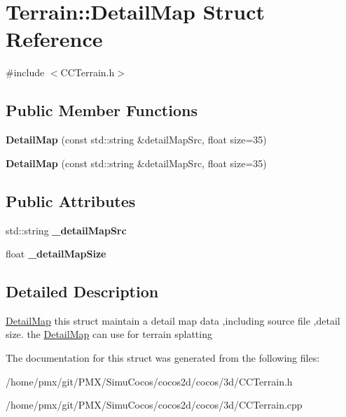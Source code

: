 \hypertarget{structTerrain_1_1DetailMap}{}\section{Terrain\+:\+:Detail\+Map Struct Reference}
\label{structTerrain_1_1DetailMap}


{\ttfamily \#include $<$C\+C\+Terrain.\+h$>$}

\subsection*{Public Member Functions}
\begin{DoxyCompactItemize}
\item 
\mbox{\label{structTerrain_1_1DetailMap_ae0789bb6945e15fe47b8c59c6853d017}} 
{\bfseries Detail\+Map} (const std\+::string \&detail\+Map\+Src, float size=35)
\item 
\mbox{\label{structTerrain_1_1DetailMap_ae0789bb6945e15fe47b8c59c6853d017}} 
{\bfseries Detail\+Map} (const std\+::string \&detail\+Map\+Src, float size=35)
\end{DoxyCompactItemize}
\subsection*{Public Attributes}
\begin{DoxyCompactItemize}
\item 
\mbox{\label{structTerrain_1_1DetailMap_af28dea1a96726b8b8697876d2b854783}} 
std\+::string {\bfseries \+\_\+detail\+Map\+Src}
\item 
\mbox{\label{structTerrain_1_1DetailMap_a3458f3923546426746be874db137c4ac}} 
float {\bfseries \+\_\+detail\+Map\+Size}
\end{DoxyCompactItemize}


\subsection{Detailed Description}
\hyperlink{structTerrain_1_1DetailMap}{Detail\+Map} this struct maintain a detail map data ,including source file ,detail size. the \hyperlink{structTerrain_1_1DetailMap}{Detail\+Map} can use for terrain splatting 

The documentation for this struct was generated from the following files\+:\begin{DoxyCompactItemize}
\item 
/home/pmx/git/\+P\+M\+X/\+Simu\+Cocos/cocos2d/cocos/3d/C\+C\+Terrain.\+h\item 
/home/pmx/git/\+P\+M\+X/\+Simu\+Cocos/cocos2d/cocos/3d/C\+C\+Terrain.\+cpp\end{DoxyCompactItemize}
